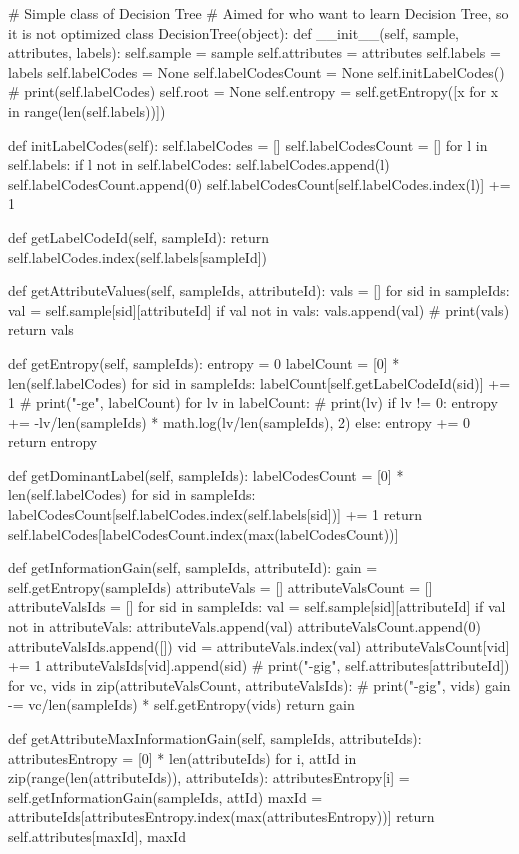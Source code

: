 \documentclass[%
oneside,                 %
final,                   %
10pt]{article}
\begin{document}
# Simple class of Decision Tree
# Aimed for who want to learn Decision Tree, so it is not optimized
class DecisionTree(object):
	def __init__(self, sample, attributes, labels):
		self.sample = sample
		self.attributes = attributes
		self.labels = labels
		self.labelCodes = None
		self.labelCodesCount = None
		self.initLabelCodes()
		# print(self.labelCodes)
		self.root = None
		self.entropy = self.getEntropy([x for x in range(len(self.labels))])

	def initLabelCodes(self):
		self.labelCodes = []
		self.labelCodesCount = []
		for l in self.labels:
			if l not in self.labelCodes:
				self.labelCodes.append(l)
				self.labelCodesCount.append(0)
			self.labelCodesCount[self.labelCodes.index(l)] += 1

	def getLabelCodeId(self, sampleId):
		return self.labelCodes.index(self.labels[sampleId])

	def getAttributeValues(self, sampleIds, attributeId):
		vals = []
		for sid in sampleIds:
			val = self.sample[sid][attributeId]
			if val not in vals:
				vals.append(val)
		# print(vals)
		return vals

	def getEntropy(self, sampleIds):
		entropy = 0
		labelCount = [0] * len(self.labelCodes)
		for sid in sampleIds:
			labelCount[self.getLabelCodeId(sid)] += 1
		# print("-ge", labelCount)
		for lv in labelCount:
			# print(lv)
			if lv != 0:
				entropy += -lv/len(sampleIds) * math.log(lv/len(sampleIds), 2)
			else:
				entropy += 0
		return entropy

	def getDominantLabel(self, sampleIds):
		labelCodesCount = [0] * len(self.labelCodes)
		for sid in sampleIds:
			labelCodesCount[self.labelCodes.index(self.labels[sid])] += 1
		return self.labelCodes[labelCodesCount.index(max(labelCodesCount))]

	def getInformationGain(self, sampleIds, attributeId):
		gain = self.getEntropy(sampleIds)
		attributeVals = []
		attributeValsCount = []
		attributeValsIds = []
		for sid in sampleIds:
			val = self.sample[sid][attributeId]
			if val not in attributeVals:
				attributeVals.append(val)
				attributeValsCount.append(0)
				attributeValsIds.append([])
			vid = attributeVals.index(val)
			attributeValsCount[vid] += 1
			attributeValsIds[vid].append(sid)
		# print("-gig", self.attributes[attributeId])
		for vc, vids in zip(attributeValsCount, attributeValsIds):
			# print("-gig", vids)
			gain -= vc/len(sampleIds) * self.getEntropy(vids)
		return gain

	def getAttributeMaxInformationGain(self, sampleIds, attributeIds):
		attributesEntropy = [0] * len(attributeIds)
		for i, attId in zip(range(len(attributeIds)), attributeIds):
			attributesEntropy[i] = self.getInformationGain(sampleIds, attId)
		maxId = attributeIds[attributesEntropy.index(max(attributesEntropy))]
		return self.attributes[maxId], maxId
\end{document}
